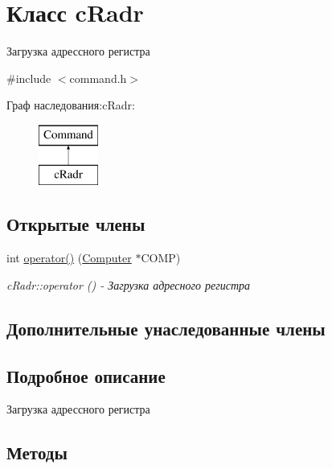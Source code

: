 \hypertarget{classc_radr}{}\section{Класс c\+Radr}
\label{classc_radr}


Загрузка адрессного регистра  




{\ttfamily \#include $<$command.\+h$>$}

Граф наследования\+:c\+Radr\+:\begin{figure}[H]
\begin{center}
\leavevmode
\includegraphics[height=2.000000cm]{classc_radr}
\end{center}
\end{figure}
\subsection*{Открытые члены}
\begin{DoxyCompactItemize}
\item 
int \hyperlink{classc_radr_af849046fb73e625b8c2c6380a70116f6}{operator()} (\hyperlink{class_computer}{Computer} $\ast$C\+O\+MP)
\begin{DoxyCompactList}\small\item\em c\+Radr\+::operator () -\/ Загрузка адресного регистра \end{DoxyCompactList}\end{DoxyCompactItemize}
\subsection*{Дополнительные унаследованные члены}


\subsection{Подробное описание}
Загрузка адрессного регистра 

\subsection{Методы}
\hypertarget{classc_radr_af849046fb73e625b8c2c6380a70116f6}{}\label{classc_radr_af849046fb73e625b8c2c6380a70116f6} 

